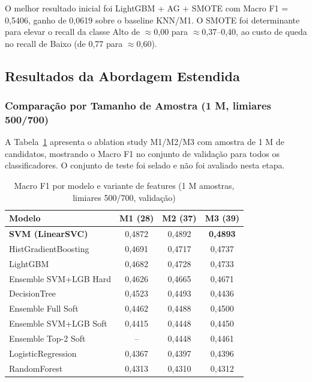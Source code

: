 \documentclass[12pt]{article}
\begin{document}
O melhor resultado inicial foi LightGBM + AG + SMOTE com Macro F1 =
0,5406, ganho de 0,0619 sobre o baseline KNN/M1. O SMOTE foi
determinante para elevar o recall da classe Alto de $\approx$0,00 para
$\approx$0,37--0,40, ao custo de queda no recall de Baixo (de 0,77 para
$\approx$0,60).

\subsection{Resultados da Abordagem Estendida}

\subsubsection{Comparação por Tamanho de Amostra (1 M, limiares 500/700)}

A Tabela~\ref{tab:pivot_1m} apresenta o ablation study M1/M2/M3 com
amostra de 1 M de candidatos, mostrando o Macro F1 no conjunto de
validação para todos os classificadores. O conjunto de teste foi selado
e não foi avaliado nesta etapa.

\begin{table}[H]
\centering
\caption{Macro F1 por modelo e variante de features (1 M amostras, limiares 500/700, validação)}
\label{tab:pivot_1m}
\small
\begin{tabular}{lccc}
\toprule
\textbf{Modelo} & \textbf{M1 (28)} & \textbf{M2 (37)} & \textbf{M3 (39)} \\
\midrule
\textbf{SVM (LinearSVC)}      & 0,4872 & 0,4892 & \textbf{0,4893} \\
HistGradientBoosting          & 0,4691 & 0,4717 & 0,4737 \\
LightGBM                      & 0,4682 & 0,4728 & 0,4733 \\
Ensemble SVM+LGB Hard         & 0,4626 & 0,4665 & 0,4671 \\
DecisionTree                  & 0,4523 & 0,4493 & 0,4436 \\
Ensemble Full Soft            & 0,4462 & 0,4488 & 0,4500 \\
Ensemble SVM+LGB Soft         & 0,4415 & 0,4448 & 0,4450 \\
Ensemble Top-2 Soft           & --     & 0,4448 & 0,4461 \\
LogisticRegression            & 0,4367 & 0,4397 & 0,4396 \\
RandomForest                  & 0,4313 & 0,4310 & 0,4312 \\
\bottomrule
\end{tabular}
\end{table}
\end{document}
